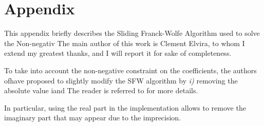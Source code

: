 \chapter{Appendix}\label{ap:appendix}

\vspace{-2.5em}
  This appendix briefly describes the Sliding Franck-Wolfe Algorithm used to solve the Non-negativ
The main author of this work is Clement Elvira, to whom I extend my greatest thanks, and I will report it for sake of completeness.




To take into account the non-negative constraint on the coefficients, the authors ofhave proposed to slightly modify the SFW algorithm by \textit{i)} removing the absolute value iand 
The reader is referred to for more details.


In particular, using the real part in the implementation allows to remove the imaginary part that may appear due to the imprecision.
